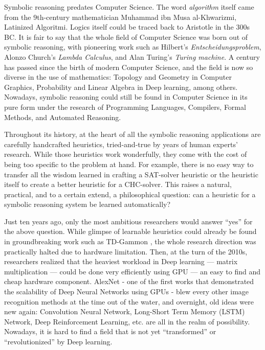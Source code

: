 Symbolic reasoning predates Computer Science. The word \emph{algorithm} itself came from the 9th-century mathematician Muhammad ibn Musa al-Khwarizmi, Latinized Algoritmi. Logics itself could be traced back to Aristotle in the 300s BC. It is fair to say that the whole field of Computer Science was born out of symbolic reasoning, with pioneering work such as Hilbert's \emph{Entscheidungsproblem}, Alonzo Church's \emph{Lambda Calculus}, and Alan Turing's \emph{Turing machine}.
A century has passed since the birth of modern Computer Science, and the field is now so diverse in the use of mathematics: Topology and Geometry in Computer Graphics, Probability and Linear Algebra in Deep learning, among others.
Nowadays, symbolic reasoning could still be found in Computer Science in its pure form under the research of Programming Languages, Compilers, Formal Methods, and Automated Reasoning. 

Throughout its history, at the heart of all the symbolic reasoning applications are carefully handcrafted heuristics, tried-and-true by years of human experts' research. While those heuristics work wonderfully, they come with the cost of being too specific to the problem at hand. For example, there is no easy way to transfer all the wisdom learned in crafting a SAT-solver heuristic or the heuristic itself to create a better heuristic for a CHC-solver. This raises a natural, practical, and to a certain extend, a philosophical question: can a heuristic for a symbolic reasoning system be learned automatically?

Just ten years ago, only the most ambitious researchers would answer ``yes'' for the above question. While glimpse of learnable heuristics could already be found in groundbreaking work such as TD-Gammon \cite{td-gammon}, the whole research direction was practically halted due to hardware limitation. Then, at the turn of the 2010s, researchers realized that the heaviest workload in Deep learning --- matrix multiplication --- could be done very efficiently using GPU --- an easy to find and cheap hardware component. AlexNet \cite{Krizhevsky:nips12} - one of the first works that demonstrated the scalability of Deep Neural Networks using GPUs - blew every other image recognition methods at the time out of the water, and overnight, old ideas were new again: Convolution Neural Network, Long-Short Term Memory (LSTM) Network, Deep Reinforcement Learning, etc. are all in the realm of possibility. Nowadays, it is hard to find a field that is not yet ``transformed'' or ``revolutionized'' by Deep learning.

